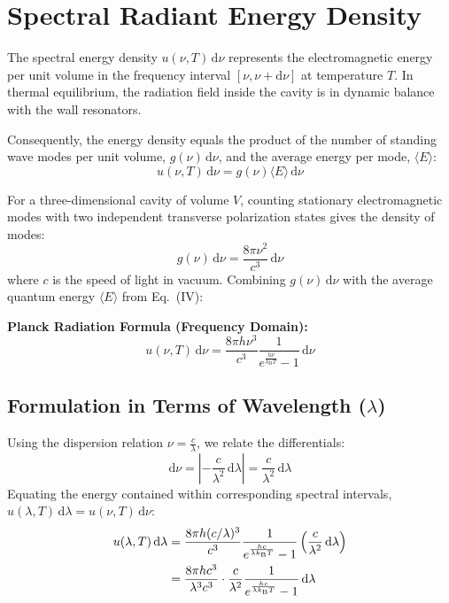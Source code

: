 \documentclass[11pt,a4paper]{article}
\newcommand{\diff}{\mathrm{d}}
\newcommand{\kB}{k_{\mathrm{B}}}
\newcommand{\avgE}{\langle E \rangle}
\begin{document}
\section{Spectral Radiant Energy Density}

The spectral energy density $u(\nu, T)\,\diff\nu$ represents the electromagnetic energy per unit volume in the frequency interval $[\nu, \nu + \diff\nu]$ at temperature $T$. In thermal equilibrium, the radiation field inside the cavity is in dynamic balance with the wall resonators.

Consequently, the energy density equals the product of the number of standing wave modes per unit volume, $g(\nu)\,\diff\nu$, and the average energy per mode, $\avgE$:
\begin{equation}
    u(\nu, T)\,\diff\nu = g(\nu) \avgE \,\diff\nu
\end{equation}

For a three-dimensional cavity of volume $V$, counting stationary electromagnetic modes with two independent transverse polarization states gives the density of modes:
\begin{equation}
    g(\nu)\,\diff\nu = \frac{8\pi \nu^2}{c^3}\,\diff\nu
\end{equation}
where $c$ is the speed of light in vacuum. Combining $g(\nu)\,\diff\nu$ with the average quantum energy $\avgE$ from Eq.~(IV):

\begin{resultbox}
\textbf{Planck Radiation Formula (Frequency Domain):}
\begin{equation}
    \boxed{u(\nu, T)\,\diff\nu = \frac{8\pi h \nu^3}{c^3} \frac{1}{e^{\frac{h\nu}{\kB T}} - 1} \,\diff\nu} \tag{V}
\end{equation}
\end{resultbox}

\subsection{Formulation in Terms of Wavelength (\texorpdfstring{$\lambda$}{lambda})}
Using the dispersion relation $\nu = \frac{c}{\lambda}$, we relate the differentials:
\begin{equation}
    \diff\nu = \left| -\frac{c}{\lambda^2} \,\diff\lambda \right| = \frac{c}{\lambda^2} \,\diff\lambda
\end{equation}
Equating the energy contained within corresponding spectral intervals, $u(\lambda, T)\,\diff\lambda = u(\nu, T)\,\diff\nu$:
\begin{align}
    u(\lambda, T)\,\diff\lambda &= \frac{8\pi h (c/\lambda)^3}{c^3} \frac{1}{e^{\frac{hc}{\lambda \kB T}} - 1} \left( \frac{c}{\lambda^2}\,\diff\lambda \right) \notag \\
    &= \frac{8\pi h c^3}{\lambda^3 c^3} \cdot \frac{c}{\lambda^2} \frac{1}{e^{\frac{hc}{\lambda \kB T}} - 1} \,\diff\lambda
\end{align}
\end{document}
